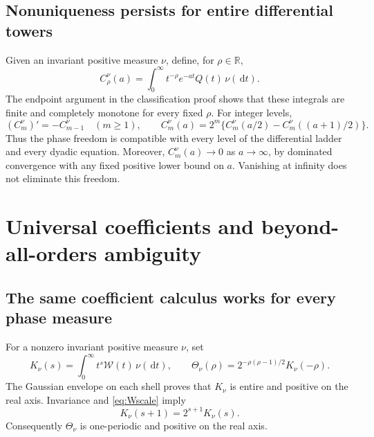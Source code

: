 \documentclass[11pt,letterpaper]{article}
\numberwithin{equation}{section}
\theoremstyle{definition}
\theoremstyle{remark}
\newcommand{\R}{\mathbb R}
\newcommand{\W}{\mathcal W}
\newcommand{\dd}{\,\mathrm d}
\begin{document}
\subsection{Nonuniqueness persists for entire differential towers}
Given an invariant positive measure $\nu$, define, for $\rho\in\R$,
\begin{equation}\label{eq:generalizedC}
 C_\rho^\nu(a)=\int_0^\infty t^{-\rho}e^{-at}Q(t)\,\nu(\dd t).
\end{equation}
The endpoint argument in the classification proof shows that these
integrals are finite and completely monotone for every fixed $\rho$.
For integer levels,
\begin{equation}\label{eq:nutowerlaws}
 (C_m^\nu)'=-C_{m-1}^\nu\quad(m\ge1),\qquad
 C_m^\nu(a)=2^m\{C_m^\nu(a/2)-C_m^\nu((a+1)/2)\}.
\end{equation}
Thus the phase freedom is compatible with every level of the differential
ladder and every dyadic equation. Moreover, $C_m^\nu(a)\to0$ as
$a\to\infty$, by dominated convergence with any fixed positive lower
bound on $a$. Vanishing at infinity does not eliminate this freedom.

\section{Universal coefficients and beyond-all-orders ambiguity}\label{sec:ambiguity}

\subsection{The same coefficient calculus works for every phase measure}
For a nonzero invariant positive measure $\nu$, set
\begin{equation}\label{eq:Knu}
 K_\nu(s)=\int_0^\infty t^s\W(t)\,\nu(\dd t),\qquad
 \Theta_\nu(\rho)=2^{-\rho(\rho-1)/2}K_\nu(-\rho).
\end{equation}
The Gaussian envelope on each shell proves that $K_\nu$ is entire and
positive on the real axis. Invariance and \eqref{eq:Wscale} imply
\begin{equation}\label{eq:Knurecurrence}
 K_\nu(s+1)=2^{s+1}K_\nu(s).
\end{equation}
Consequently $\Theta_\nu$ is one-periodic and positive on the real axis.
\end{document}
